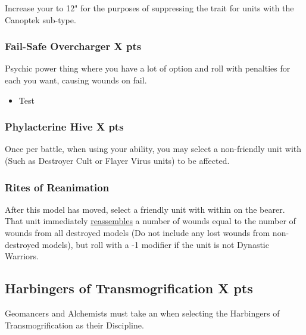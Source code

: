 Increase your  to 12" for the purposes of suppressing the  trait for units with the Canoptek sub-type.

\subsubsection[Fail-Safe Overcharger ]{Fail-Safe Overcharger  \hrulefill X pts}

Psychic power thing where you have a lot of option and roll with penalties for each you want, causing wounds on fail.

\begin{itemize}
	\item Test
\end{itemize}

\subsubsection[Phylacterine Hive ]{Phylacterine Hive  \hrulefill X pts}

Once per battle, when using your  ability, you may select a non-friendly unit with  (Such as Destroyer Cult or Flayer Virus units) to be affected.

\subsubsection{Rites of Reanimation} \label{Rites of Reanimation}

After this model has moved, select a friendly unit with  within  on the bearer. That unit immediately \textcolor{violet}{\hyperref[Reanimation Protocols]{reassembles}} a number of wounds equal to the number of wounds from all destroyed models (Do not include any lost wounds from non-destroyed models), but roll with a -1 modifier if the unit is not Dynastic Warriors.



\subsection[Harbingers of Transmogrification ]{Harbingers of Transmogrification  \hrulefill X pts}

Geomancers and Alchemists must take an  when selecting the Harbingers of Transmogrification as their Discipline.

